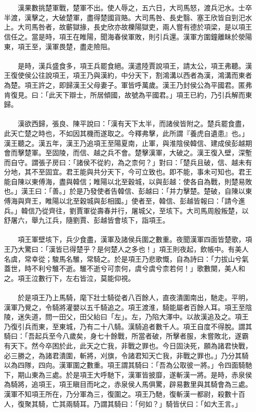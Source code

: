 \\\\
　　漢果數挑楚軍戰，楚軍不出。使人辱之，五六日，大司馬怒，渡兵汜水。士卒半渡，漢擊之，大破楚軍，盡得楚國貨賂。大司馬咎、長史翳、塞王欣皆自剄汜水上。大司馬咎者，故蘄獄掾，長史欣亦故櫟陽獄吏，兩人嘗有德於項梁，是以項王信任之。當是時，項王在睢陽，聞海春侯軍敗，則引兵還。漢軍方圍鐘離眛於滎陽東，項王至，漢軍畏楚，盡走險阻。
\\\\
　　是時，漢兵盛食多，項王兵罷食絕。漢遣陸賈說項王，請太公，項王弗聽。漢王復使侯公往說項王，項王乃與漢約，中分天下，割鴻溝以西者為漢，鴻溝而東者為楚。項王許之，即歸漢王父母妻子。軍皆呼萬歲。漢王乃封侯公為平國君。匿弗肯復見。曰：「此天下辯士，所居傾國，故號為平國君。」項王已約，乃引兵解而東歸。
\\\\
　　漢欲西歸，張良、陳平說曰：「漢有天下太半，而諸侯皆附之。楚兵罷食盡，此天亡楚之時也，不如因其機而遂取之。今釋弗擊，此所謂『養虎自遺患』也。」漢王聽之。漢五年，漢王乃追項王至陽夏南，止軍，與淮陰侯韓信、建成侯彭越期會而擊楚軍。至固陵，而信、越之兵不會。楚擊漢軍，大破之。漢王復入壁，深塹而自守。謂張子房曰：「諸侯不從約，為之柰何？」對曰：「楚兵且破，信、越未有分地，其不至固宜。君王能與共分天下，今可立致也。即不能，事未可知也。君王能自陳以東傅海，盡與韓信；睢陽以北至穀城，以與彭越：使各自為戰，則楚易敗也。」漢王曰：「善。」於是乃發使者告韓信、彭越曰：「并力擊楚。楚破，自陳以東傅海與齊王，睢陽以北至穀城與彭相國。」使者至，韓信、彭越皆報曰：「請今進兵。」韓信乃從齊往，劉賈軍從壽春并行，屠城父，至垓下。大司馬周殷叛楚，以舒屠六，舉九江兵，隨劉賈、彭越皆會垓下，詣項王。
\\\\
　　項王軍壁垓下，兵少食盡，漢軍及諸侯兵圍之數重。夜聞漢軍四面皆楚歌，項王乃大驚曰：「漢皆已得楚乎？是何楚人之多也！」項王則夜起，飲帳中。有美人名虞，常幸從；駿馬名騅，常騎之。於是項王乃悲歌慨，自為詩曰：「力拔山兮氣蓋世，時不利兮騅不逝。騅不逝兮可柰何，虞兮虞兮柰若何！」歌數闋，美人和之。項王泣數行下，左右皆泣，莫能仰視。
\\\\
　　於是項王乃上馬騎，麾下壯士騎從者八百餘人，直夜潰圍南出，馳走。平明，漢軍乃覺之，令騎將灌嬰以五千騎追之。項王渡淮，騎能屬者百餘人耳。項王至陰陵，迷失道，問一田父，田父紿曰「左」。左，乃陷大澤中。以故漢追及之。項王乃復引兵而東，至東城，乃有二十八騎。漢騎追者數千人。項王自度不得脫。謂其騎曰：「吾起兵至今八歲矣，身七十餘戰，所當者破，所擊者服，未嘗敗北，遂霸有天下。然今卒困於此，此天之亡我，非戰之罪也。今日固決死，願為諸君快戰，必三勝之，為諸君潰圍，斬將，刈旗，令諸君知天亡我，非戰之罪也。」乃分其騎以為四隊，四向。漢軍圍之數重。項王謂其騎曰：「吾為公取彼一將。」令四面騎馳下，期山東為三處。於是項王大呼馳下，漢軍皆披靡，遂斬漢一將。是時，赤泉侯為騎將，追項王，項王瞋目而叱之，赤泉侯人馬俱驚，辟易數里與其騎會為三處。漢軍不知項王所在，乃分軍為三，復圍之。項王乃馳，復斬漢一都尉，殺數十百人，復聚其騎，亡其兩騎耳。乃謂其騎曰：「何如？」騎皆伏曰：「如大王言。」
